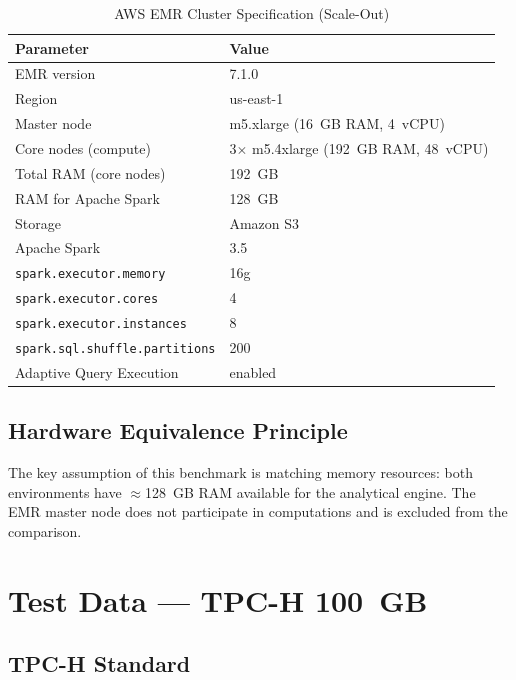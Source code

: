 \documentclass[12pt,a4paper]{article}
\begin{document}
\begin{table}[H]
  \centering
  \caption{AWS EMR Cluster Specification (Scale-Out)}
  \label{tab:emr-spec}
  \begin{tabular}{ll}
    \toprule
    \textbf{Parameter} & \textbf{Value} \\
    \midrule
    EMR version              & 7.1.0 \\
    Region                   & us-east-1 \\
    Master node              & m5.xlarge (16~GB RAM, 4~vCPU) \\
    Core nodes (compute)     & 3$\times$ m5.4xlarge (192~GB RAM, 48~vCPU) \\
    Total RAM (core nodes)   & 192~GB \\
    RAM for Apache Spark     & 128~GB \\
    Storage                  & Amazon S3 \\
    Apache Spark             & 3.5 \\
    \texttt{spark.executor.memory}       & 16g \\
    \texttt{spark.executor.cores}        & 4 \\
    \texttt{spark.executor.instances}    & 8 \\
    \texttt{spark.sql.shuffle.partitions} & 200 \\
    Adaptive Query Execution & enabled \\
    \bottomrule
  \end{tabular}
\end{table}

\subsection{Hardware Equivalence Principle}

The key assumption of this benchmark is matching memory resources: both environments
have $\approx$128~GB RAM available for the analytical engine. The EMR master node
does not participate in computations and is excluded from the comparison.

\section{Test Data --- TPC-H 100~GB}

\subsection{TPC-H Standard}
\end{document}
